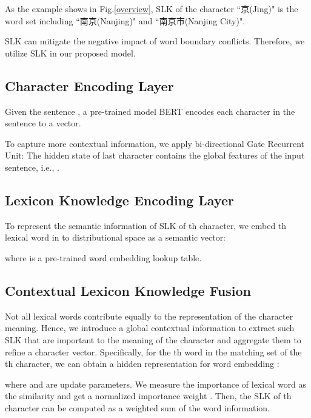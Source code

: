 \documentclass[conference]{IEEEtran}
\begin{document}
\begin{CJK*}{UTF8}{gbsn}
As the example shows in Fig.\ref{overview}, SLK of the character ``京(Jing)" is 
the word set including ``南京(Nanjing)" and ``南京市(Nanjing City)".
\end{CJK*}
SLK can mitigate the negative impact of word boundary conflicts. Therefore, we utilize SLK
in our proposed model. 




\subsection{Character Encoding Layer}
Given the sentence , a pre-trained model BERT \cite{devlin-etal-2019-bert} 
encodes each character  in the sentence to a vector. 

To capture more contextual information, 
we apply bi-directional Gate Recurrent Unit: 
The hidden state of last character contains the global features of the input sentence, i.e., .




\subsection{Lexicon Knowledge Encoding Layer}



To represent the semantic information of SLK of th character, 
we embed th lexical word  in  to distributional space as a semantic vector:

where  is a pre-trained word embedding lookup table. 




\subsection{Contextual Lexicon Knowledge Fusion}
Not all lexical words contribute equally to the representation of the character meaning.
Hence, we introduce a global contextual information to extract such SLK
that are important to the meaning of the character 
and aggregate them to refine a character
vector.
Specifically, for the th word in the matching set  of the th character,
we can obtain a hidden representation 
for word embedding :

where  and  are update parameters. 
We measure the importance of lexical word as the similarity 
and get a normalized importance weight .
Then, 
the SLK of th character can be computed as
a weighted sum of the word information.
\end{document}
